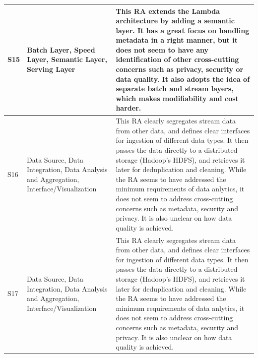 \documentclass[review]{elsarticle}
\begin{document}
\begin{table}[h!]
\begin{tabular}{ |p{0.5cm}|p{3cm}|p{7.5cm}| }
        \hline
        S15 & Batch Layer, Speed Layer, Semantic Layer, Serving Layer & This RA extends the Lambda architecture by adding a semantic layer. It has a great focus on handling metadata in a right manner, but it does not seem to have any identification of other cross-cutting concerns such as privacy, security or data quality. It also adopts the idea of separate batch and stream layers, which makes modifiability and cost harder. \\
        \hline
        S16 & Data Source, Data Integration, Data Analysis and Aggregation, Interface/Visualization & This RA clearly segregates stream data from other data, and defines clear interfaces for ingestion of different data types. It then passes the data directly to a distributed storage (Hadoop's HDFS), and retrieves it later for deduplication and cleaning. While the RA seems to have addressed the minimum requirements of data anlytics, it does not seem to address cross-cutting concerns such as metadata, security and privacy. It is also unclear on how data quality is achieved. \\
        \hline
        S17 & Data Source, Data Integration, Data Analysis and Aggregation, Interface/Visualization & This RA clearly segregates stream data from other data, and defines clear interfaces for ingestion of different data types. It then passes the data directly to a distributed storage (Hadoop's HDFS), and retrieves it later for deduplication and cleaning. While the RA seems to have addressed the minimum requirements of data anlytics, it does not seem to address cross-cutting concerns such as metadata, security and privacy. It is also unclear on how data quality is achieved. \\
        \hline
    \end{tabular}
    \end{table}
\end{document}
